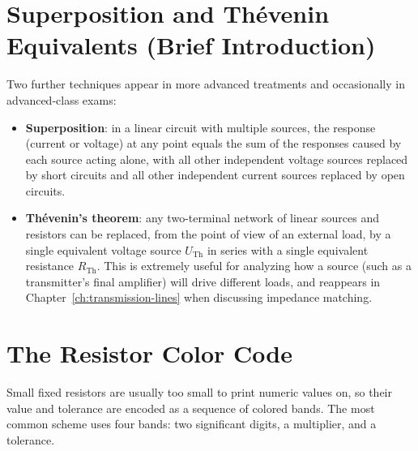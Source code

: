 \section{Superposition and Thévenin Equivalents (Brief Introduction)}

Two further techniques appear in more advanced treatments and occasionally
in advanced-class exams:

\begin{itemize}
\item \textbf{Superposition}: in a linear circuit with multiple sources,
the response (current or voltage) at any point equals the sum of the
responses caused by each source acting alone, with all other independent
voltage sources replaced by short circuits and all other independent
current sources replaced by open circuits.
\item \textbf{Thévenin's theorem}: any two-terminal network of linear
sources and resistors can be replaced, from the point of view of an
external load, by a single equivalent voltage source $U_{\text{Th}}$ in
series with a single equivalent resistance $R_{\text{Th}}$. This is
extremely useful for analyzing how a source (such as a transmitter's
final amplifier) will drive different loads, and reappears in
Chapter~\ref{ch:transmission-lines} when discussing impedance matching.
\end{itemize}

\section{The Resistor Color Code}
\label{sec:color-code}

Small fixed resistors are usually too small to print numeric values on,
so their value and tolerance are encoded as a sequence of colored bands.
The most common scheme uses four bands: two significant digits, a
multiplier, and a tolerance.

